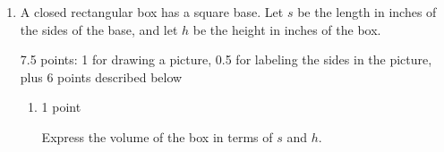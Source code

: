 \documentclass{article}
\begin{document}
\begin{enumerate}[resume]
\begin{enumerate}
    \begin{problem}[\nstretch{0.5}]
      The garden needs to be at least 2 feet long and 2 feet wide to
      accommodate the tomato plants. With this restriction, what's the
      domain of the function you wrote in (a)? 
    \end{problem}

    \begin{solution}
      The domain is the set of all possible values of $w$. Since the garden must be at least 2 feet in each dimension,
      the minimum possible value of $w$ is 2, $w \geq 2$. We also know that $\ell \geq 2$, and this means that there will
      be a maximum possible value of $w$. To find it, we can solve the following inequality.
      \begin{align*}
          \ell & \geq 2 \\
          20 - \tfrac{1}{2} w & \geq 2 \\
          40 - w  & \geq 4 \\
          -w & \geq -36 \\
          w & \leq 36
      \end{align*}
      Thus, the domain is $\boxed{2 \leq w \leq 36}$.
    \end{solution}

  \end{enumerate}

\item %

  A closed rectangular box has a square base. Let $s$ be the length in inches of the sides of the base, and let $h$ be the height in inches of the box.

  \begin{grading}
    7.5 points: 1 for drawing a picture, 0.5 for labeling the sides in
    the picture, plus 6 points described below
  \end{grading}

  \begin{enumerate}

  \item

    \begin{grading}
      1 point
    \end{grading}

    \begin{problem}[\vfill]
      Express the volume of the box in terms of $s$ and $h$.
    \end{problem}


\end{enumerate}
\end{enumerate}
\end{document}
